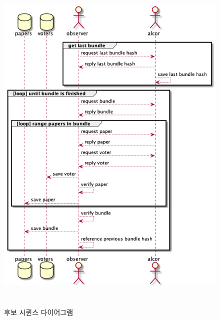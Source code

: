 \documentclass[10pt,a4paper,left=15mm,right=15mm,top=20mm,bottom=20mm]{article}
\begin{document}
    \begin{figure}[h]
        \begin{center}
            \includegraphics[height=17cm]{observer-verify.png}
            \caption{후보 시퀸스 다이어그램}
        \end{center}
    \end{figure}
\end{document}
